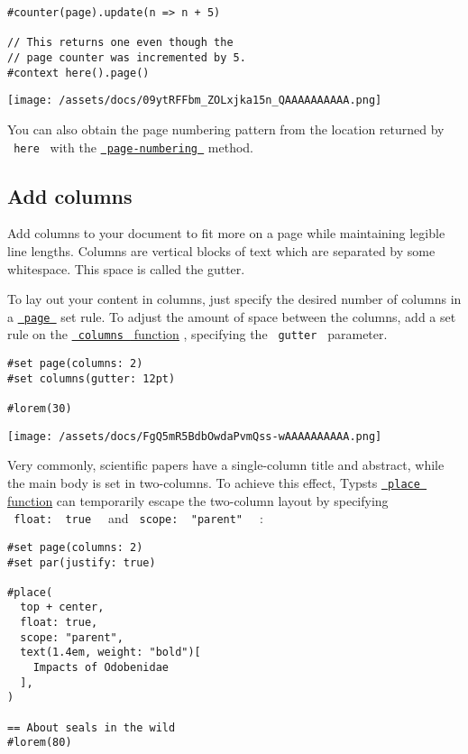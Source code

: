 \begin{verbatim}
#counter(page).update(n => n + 5)

// This returns one even though the
// page counter was incremented by 5.
#context here().page()
\end{verbatim}

\texttt{[image: /assets/docs/09ytRFFbm\_ZOLxjka15n\_QAAAAAAAAAA.png]}

You can also obtain the page numbering pattern from the location
returned by \texttt{\ here\ } with the
\href{/docs/reference/introspection/location/\#definitions-page-numbering}{\texttt{\ page-numbering\ }}
method.

\subsection{Add columns}\label{columns}

Add columns to your document to fit more on a page while maintaining
legible line lengths. Columns are vertical blocks of text which are
separated by some whitespace. This space is called the gutter.

To lay out your content in columns, just specify the desired number of
columns in a
\href{/docs/reference/layout/page/\#parameters-columns}{\texttt{\ page\ }}
set rule. To adjust the amount of space between the columns, add a set
rule on the \href{/docs/reference/layout/columns/}{\texttt{\ columns\ }
function} , specifying the \texttt{\ gutter\ } parameter.

\begin{verbatim}
#set page(columns: 2)
#set columns(gutter: 12pt)

#lorem(30)
\end{verbatim}

\texttt{[image: /assets/docs/FgQ5mR5BdbOwdaPvmQss-wAAAAAAAAAA.png]}

Very commonly, scientific papers have a single-column title and
abstract, while the main body is set in two-columns. To achieve this
effect, Typst\textquotesingle s
\href{/docs/reference/layout/place/}{\texttt{\ place\ } function} can
temporarily escape the two-column layout by specifying
\texttt{\ float:\ }{\texttt{\ true\ }}\texttt{\ } and
\texttt{\ scope:\ }{\texttt{\ "parent"\ }}\texttt{\ } :

\begin{verbatim}
#set page(columns: 2)
#set par(justify: true)

#place(
  top + center,
  float: true,
  scope: "parent",
  text(1.4em, weight: "bold")[
    Impacts of Odobenidae
  ],
)

== About seals in the wild
#lorem(80)
\end{verbatim}

